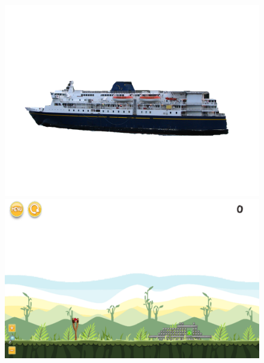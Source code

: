 \documentclass{dalthesis}
\begin{document}
\begin{figure}
  \includegraphics[width=\textwidth,height=\textheight,keepaspectratio]{levels/pictures/ships/ferry.jpg}
  \includegraphics[width=\textwidth,height=\textheight,keepaspectratio]{levels/screenshots/ships/ferry.png}
\end{figure}
\end{document}
